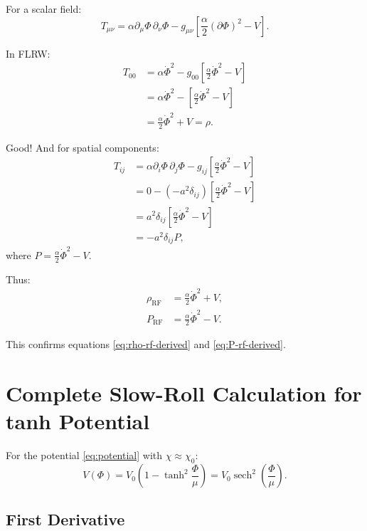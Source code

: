 \documentclass[11pt,a4paper]{article}
\numberwithin{equation}{section}
\theoremstyle{plain}
\theoremstyle{definition}
\theoremstyle{remark}
\begin{document}
For a scalar field:
\begin{equation}
T_{\mu\nu} = \alpha\partial_\mu\Phi\,\partial_\nu\Phi - g_{\mu\nu}\left[\frac{\alpha}{2}(\partial\Phi)^2 - V\right].
\end{equation}

In FLRW:
\begin{align}
T_{00} &= \alpha\dot{\Phi}^2 - g_{00}\left[\frac{\alpha}{2}\dot{\Phi}^2 - V\right]\\
&= \alpha\dot{\Phi}^2 - \left[\frac{\alpha}{2}\dot{\Phi}^2 - V\right]\\
&= \frac{\alpha}{2}\dot{\Phi}^2 + V = \rho.
\end{align}

Good! And for spatial components:
\begin{align}
T_{ij} &= \alpha\partial_i\Phi\,\partial_j\Phi - g_{ij}\left[\frac{\alpha}{2}\dot{\Phi}^2 - V\right]\\
&= 0 - (-a^2\delta_{ij})\left[\frac{\alpha}{2}\dot{\Phi}^2 - V\right]\\
&= a^2\delta_{ij}\left[\frac{\alpha}{2}\dot{\Phi}^2 - V\right]\\
&= -a^2\delta_{ij}P,
\end{align}
where $P = \frac{\alpha}{2}\dot{\Phi}^2 - V$.

Thus:
\begin{align}
\rho_{\mathrm{RF}} &= \frac{\alpha}{2}\dot{\Phi}^2 + V,\\
P_{\mathrm{RF}} &= \frac{\alpha}{2}\dot{\Phi}^2 - V.
\end{align}

This confirms equations \eqref{eq:rho-rf-derived} and \eqref{eq:P-rf-derived}.

\section{Complete Slow-Roll Calculation for tanh Potential}
\label{app:slowroll}

For the potential \eqref{eq:potential} with $\chi \approx \chi_0$:
\begin{equation}
V(\Phi) = V_0\left(1 - \tanh^2\frac{\Phi}{\mu}\right) = V_0\operatorname{sech}^2\left(\frac{\Phi}{\mu}\right).
\end{equation}

\subsection{First Derivative}
\end{document}
